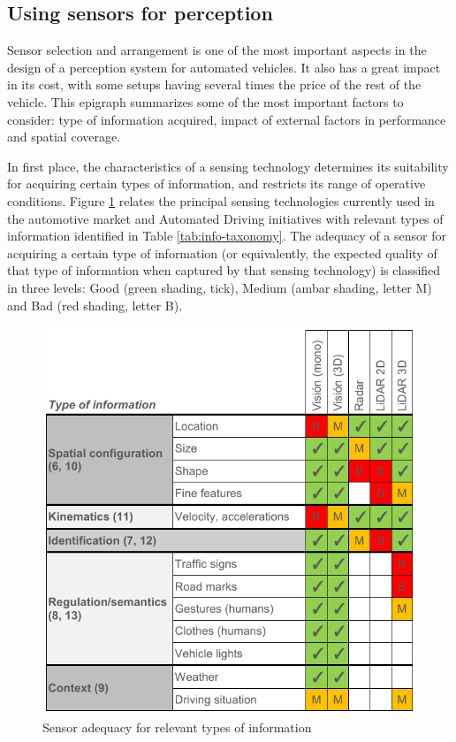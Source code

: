 \subsection{Using sensors for perception}
\label{sec:03-e-sensors-for-perception}

Sensor selection and arrangement is one of the most important aspects in the 
design of a perception system for automated vehicles. It also has a great impact
in its cost, with some setups having several times the price of the rest of 
the vehicle. 
This epigraph summarizes some of the most important factors to consider: type 
of information acquired, impact of external factors in performance and spatial
coverage.

In first place, the characteristics of a sensing technology determines its 
suitability for acquiring certain types of information, and restricts its range 
of operative conditions.
Figure \ref{fig:information_vs_sensors} relates the principal sensing 
technologies currently used in the automotive market and Automated Driving
initiatives with relevant types of information identified in Table 
\ref{tab:info-taxonomy}. The adequacy of a sensor for acquiring a certain type
of information (or equivalently, the expected quality of that type of
information when captured by that sensing technology) is classified in three
levels: Good (green shading, tick), Medium (ambar shading, letter M) and Bad
(red shading, letter B).

\begin{figure}[h]
    \centering
    \includegraphics[width=0.95\linewidth]{"img/information_types_sensors"}
    \caption{Sensor adequacy for relevant types of information}
    \label{fig:information_vs_sensors}
\end{figure}

